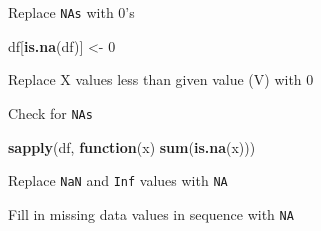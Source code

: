 \documentclass[10,portrait]{article}
\newenvironment{Shaded}{\begin{snugshade}}{\end{snugshade}}
\newcommand{\KeywordTok}[1]{\textcolor[rgb]{0.13,0.29,0.53}{\textbf{#1}}}
\newcommand{\DecValTok}[1]{\textcolor[rgb]{0.00,0.00,0.81}{#1}}
\newcommand{\StringTok}[1]{\textcolor[rgb]{0.31,0.60,0.02}{#1}}
\newcommand{\OtherTok}[1]{\textcolor[rgb]{0.56,0.35,0.01}{#1}}
\newcommand{\ControlFlowTok}[1]{\textcolor[rgb]{0.13,0.29,0.53}{\textbf{#1}}}
\newcommand{\OperatorTok}[1]{\textcolor[rgb]{0.81,0.36,0.00}{\textbf{#1}}}
\newcommand{\NormalTok}[1]{#1}
\begin{document}
Replace \texttt{NAs} with 0's

\begin{Shaded}
\begin{Highlighting}[]
\NormalTok{df[}\KeywordTok{is.na}\NormalTok{(df)] <-}\StringTok{ }\DecValTok{0}
\end{Highlighting}
\end{Shaded}

Replace X values less than given value (V) with 0

\begin{Shaded}
\end{Shaded}

Check for \texttt{NAs}

\begin{Shaded}
\begin{Highlighting}[]
\KeywordTok{sapply}\NormalTok{(df, }\ControlFlowTok{function}\NormalTok{(x) }\KeywordTok{sum}\NormalTok{(}\KeywordTok{is.na}\NormalTok{(x)))}
\end{Highlighting}
\end{Shaded}

Replace \texttt{NaN} and \texttt{Inf} values with \texttt{NA}

\begin{Shaded}
\end{Shaded}

Fill in missing data values in sequence with \texttt{NA}
\end{document}
